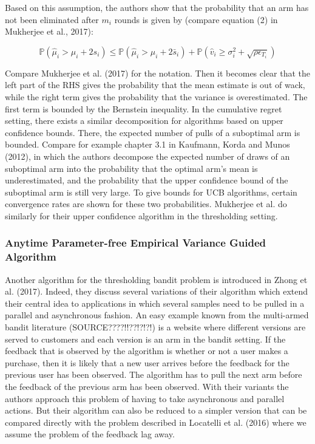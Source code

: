 \documentclass[12pt,]{article}
\begin{document}
Based on this assumption, the authors show that the probability that an
arm has not been eliminated after \(m_i\) rounds is given by (compare
equation (2) in Mukherjee et al., 2017):

\begin{equation} \label{Mukherjee2017Equation2}
\mathbb{P}(\hat{\mu}_i > \mu_i + 2s_i) \leq \mathbb{P} (\hat{\mu}_i > \mu_i + 2\bar{s}_i) + \mathbb{P}(\hat{v}_i \geq \sigma^2_i + \sqrt{\rho \epsilon_{T_i}})
\end{equation}

Compare Mukherjee et al. (2017) for the notation. Then it becomes clear
that the left part of the RHS gives the probability that the mean
estimate is out of wack, while the right term gives the probability that
the variance is overestimated. The first term is bounded by the
Bernstein inequality. In the cumulative regret setting, there exists a
similar decomposition for algorithms based on upper confidence bounds.
There, the expected number of pulls of a suboptimal arm is bounded.
Compare for example chapter 3.1 in Kaufmann, Korda and Munos (2012), in
which the authors decompose the expected number of draws of an
suboptimal arm into the probability that the optimal arm's mean is
underestimated, and the probability that the upper confidence bound of
the suboptimal arm is still very large. To give bounds for UCB
algorithms, certain convergence rates are shown for these two
probabilities. Mukherjee et al. do similarly for their upper confidence
algorithm in the thresholding setting.

\subsubsection{\texorpdfstring{Anytime Parameter-free Empirical Variance
Guided Algorithm
\label{sec:EVTAlgorithm}}{Anytime Parameter-free Empirical Variance Guided Algorithm }}\label{anytime-parameter-free-empirical-variance-guided-algorithm}

Another algorithm for the thresholding bandit problem is introduced in
Zhong et al. (2017). Indeed, they discuss several variations of their
algorithm which extend their central idea to applications in which
several samples need to be pulled in a parallel and asynchronous
fashion. An easy example known from the multi-armed bandit literature
(SOURCE????!!??!?!?!) is a website where different versions are served
to customers and each version is an arm in the bandit setting. If the
feedback that is observed by the algorithm is whether or not a user
makes a purchase, then it is likely that a new user arrives before the
feedback for the previous user has been observed. The algorithm has to
pull the next arm before the feedback of the previous arm has been
observed. With their variants the authors approach this problem of
having to take asynchronous and parallel actions. But their algorithm
can also be reduced to a simpler version that can be compared directly
with the problem described in Locatelli et al. (2016) where we assume
the problem of the feedback lag away.
\end{document}
